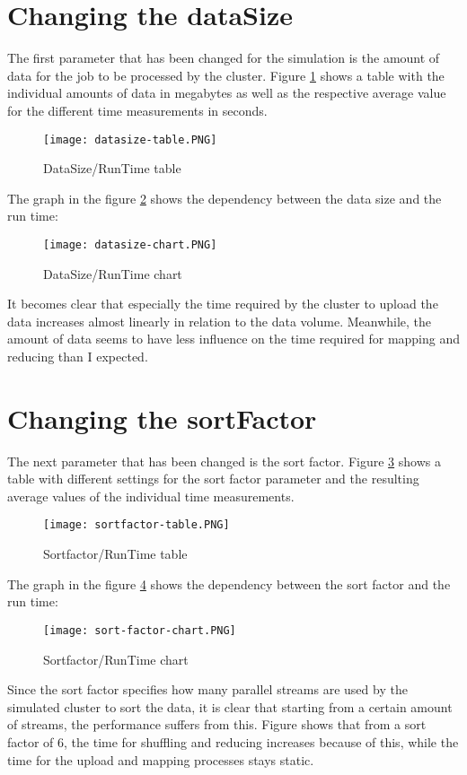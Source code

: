 \section{Changing the dataSize}
The first parameter that has been changed for the simulation is the amount of data for the job to be processed by the cluster. Figure \ref{datasize-table} shows a table with the individual amounts of data in megabytes as well as the respective average value for the different time measurements in seconds. 
\begin{figure}[H]
	\centering
	\texttt{[image: datasize-table.PNG]}
	\caption[Caption for LOF]{DataSize/RunTime table}
	\label{datasize-table}
\end{figure}
The graph in the figure \ref{datasize-chart} shows the dependency between the data size and the run time:
\begin{figure}[H]
	\centering
	\texttt{[image: datasize-chart.PNG]}
	\caption[Caption for LOF]{DataSize/RunTime chart}
	\label{datasize-chart}
\end{figure}
It becomes clear that especially the time required by the cluster to upload the data increases almost linearly in relation to the data volume. Meanwhile, the amount of data seems to have less influence on the time required for mapping and reducing than I expected.
\section{Changing the sortFactor}
The next parameter that has been changed is the sort factor. Figure \ref{sortfactor-table} shows a table with different settings for the sort factor parameter and the resulting average values of the individual time measurements.
\begin{figure}[H]
	\centering
	\texttt{[image: sortfactor-table.PNG]}
	\caption[Caption for LOF]{Sortfactor/RunTime table}
	\label{sortfactor-table}
\end{figure}
The graph in the figure \ref{sort-factor-chart} shows the dependency between the sort factor and the run time:
\begin{figure}[H]
	\centering
	\texttt{[image: sort-factor-chart.PNG]}
	\caption[Caption for LOF]{Sortfactor/RunTime chart}
	\label{sort-factor-chart}
\end{figure}
Since the sort factor specifies how many parallel streams are used by the simulated cluster to sort the data, it is clear that starting from a certain amount of streams, the performance suffers from this. Figure shows that from a sort factor of 6, the time for shuffling and reducing increases because of this, while the time for the upload and mapping processes stays static.
